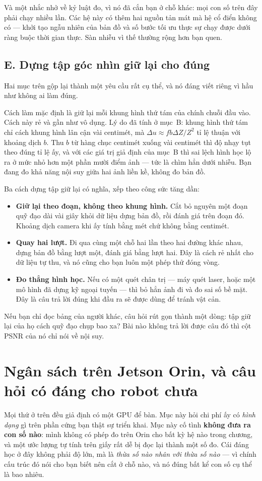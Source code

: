 \documentclass[../../deep_learning.tex]{subfiles}
\begin{document}
Và một nhắc nhở về kỷ luật đo, vì nó đã cắn bạn ở chỗ khác: mọi con số trên đây phải chạy nhiều lần. Các hệ này có thêm hai nguồn tản mát mà hệ cổ điển không có --- khởi tạo ngẫu nhiên của bản đồ và số bước tối ưu thực sự chạy được dưới ràng buộc thời gian thực. Sàn nhiễu vì thế thường rộng hơn bạn quen.

\subsection{E. Dựng tập góc nhìn giữ lại cho đúng}
Hai mục trên gộp lại thành một yêu cầu rất cụ thể, và nó đáng viết riêng vì hầu như không ai làm đúng.

Cách làm mặc định là giữ lại mỗi khung hình thứ tám của chính chuỗi đầu vào. Cách này rẻ và gần như vô dụng. Lý do đã tính ở mục~B: khung hình thứ tám chỉ cách khung hình lân cận vài centimét, mà \(\Delta u \approx f b \Delta Z / Z^{2}\) tỉ lệ thuận với khoảng dịch \(b\). Thu \(b\) từ hàng chục centimét xuống vài centimét thì độ nhạy tụt theo đúng tỉ lệ ấy, và với các giá trị giả định của mục~B thì sai lệch hình học lộ ra ở mức nhỏ hơn một phần mười điểm ảnh --- tức là chìm hẳn dưới nhiễu. Bạn đang đo khả năng nội suy giữa hai ảnh liền kề, không đo bản đồ.

Ba cách dựng tập giữ lại có nghĩa, xếp theo công sức tăng dần:

\begin{itemize}
\item \textbf{Giữ lại theo đoạn, không theo khung hình.} Cắt bỏ nguyên một đoạn quỹ đạo dài vài giây khỏi dữ liệu dựng bản đồ, rồi đánh giá trên đoạn đó. Khoảng dịch camera khi ấy tính bằng mét chứ không bằng centimét.
\item \textbf{Quay hai lượt.} Đi qua cùng một chỗ hai lần theo hai đường khác nhau, dựng bản đồ bằng lượt một, đánh giá bằng lượt hai. Đây là cách rẻ nhất cho dữ liệu tự thu, và nó cũng cho bạn luôn một phép thử đóng vòng.
\item \textbf{Đo thẳng hình học.} Nếu có một quét chân trị --- máy quét laser, hoặc một mô hình đã dựng kỹ ngoại tuyến --- thì bỏ hẳn ảnh đi và đo sai số bề mặt. Đây là câu trả lời đúng khi đầu ra sẽ được dùng để tránh vật cản.
\end{itemize}

Nếu bạn chỉ đọc bảng của người khác, câu hỏi rút gọn thành một dòng: tập giữ lại của họ cách quỹ đạo chụp bao xa? Bài nào không trả lời được câu đó thì cột PSNR của nó chỉ nói về nội suy.

\section{Ngân sách trên Jetson Orin, và câu hỏi có đáng cho robot chưa}
\label{sec:f32-orin}
Mọi thứ ở trên đều giả định có một GPU để bàn. Mục này hỏi chi phí ấy có \emph{hình dạng} gì trên phần cứng bạn thật sự triển khai. Mục này cố tình \textbf{không đưa ra con số nào}: mình không có phép đo trên Orin cho bất kỳ hệ nào trong chương, và một ước lượng tự tính trên giấy rất dễ bị đọc lại thành một số đo. Cái đáng học ở đây không phải độ lớn, mà là \emph{thừa số nào nhân với thừa số nào} --- vì chính cấu trúc đó nói cho bạn biết nên cắt ở chỗ nào, và nó đúng bất kể con số cụ thể là bao nhiêu.
\end{document}
